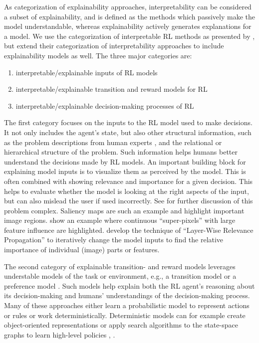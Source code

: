 \documentclass[twoside,11pt]{article}
\begin{document}
\begin{enumerate}
As categorization of explainability approaches, interpretability can be considered a subset of explainability, and is defined as the methods which passively make the model understandable, whereas explainability actively generates explanations for a model. We use the categorization of interpretable RL methods as presented by \citet{GlanoisEtAl:2021:SurveyInterpretableRL}, but extend their categorization of interpretability approaches to include explainability models as well. The three major categories are: 
\begin{enumerate}
    \item interpretable/explainable inputs of RL models
    \item interpretable/explainable transition and reward models for RL
    \item interpretable/explainable decision-making processes of RL
\end{enumerate}

The first category focuses on the inputs to the RL model used to make decisions. It not only includes the agent's state, but also other structural information, such as the problem descriptions from human experts \citep{hasanbeig2021deepsynth}, and the relational \citep{battaglia2018relational,martinez2017relational} or hierarchical structure \citep{andreas2017modular,lyu2019sdrl} of the problem. Such information helps humans better understand the decisions made by RL models. 
An important building block for explaining model inputs is to visualize them as perceived by the model. This is often combined with showing relevance and importance for a given decision. This helps to evaluate whether the model is looking at the right aspects of the input, but can also mislead the user if used incorrectly. See \citet{EvansEtAl:2021:ExplainabilityParadox} for further discussion of this problem complex.
Saliency maps are such an example and highlight important image regions. \citet{LiuEtAl:2018:LinearModelUTrees} show an example where continuous ``super-pixels'' with large feature influence are highlighted. \citet{Bach:2015:LayerWiseRelevancePropagation} develop the technique of ``Layer-Wise Relevance Propagation'' to iteratively change the model inputs to find the relative importance of individual (image) parts or features.

The second category of explainable transition- and reward models leverages understable models of the task or environment, e.g., a transition model \citep{martinez2016learning,zhu2020object} or a preference model \citep{icarte2018using,toro2019learning}. Such models help explain both the RL agent's reasoning about its decision-making and humans' understandings of the decision-making process. Many of these approaches either learn a probabilistic model to represent actions \citep{walsh2010efficient} or rules \citep{Walker} or work deterministically. Deterministic models can for example create object-oriented representations \citep{NEURIPS2018_df0aab05} or apply search algorithms to the state-space graphs to learn high-level policies \citep{pmlr-v80-zhang18k}, \citep{NEURIPS2019_5c48ff18}.


\end{enumerate}
\end{document}
